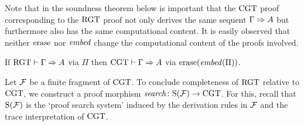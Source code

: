 Note that in the soundness theorem below is important that the $\mathrm{CGT}$ proof
corresponding to the $\mathrm{RGT}$ proof not only derives the same sequent $\Gamma
\Rightarrow A$ but furthermore also has the same computational content. It is easily
observed that neither $\mathrm{erase}$ nor $\mathit{embed}$ change the computational content of
the proofs involved.

\begin{corollary}[Soundness]\label{lem:rct-sound}
  If $\mathrm{RGT} \vdash \Gamma \Rightarrow A$ via $\Pi$ then $\mathrm{CGT} \vdash \Gamma \Rightarrow
  A$ via $\mathrm{erase}(\mathit{embed}(\Pi))$.
\end{corollary}

Let $\mathcal{F}$ be a finite fragment of $\mathrm{CGT}$. To conclude completeness of $\mathrm{RGT}$
relative to $\mathrm{CGT}$, we
construct a proof morphism $\mathit{search} \colon \mathrm{S}(\mathcal{F}) \to \mathrm{CGT}$. For this, recall that
$\mathrm{S}(\mathcal{F})$ is the `proof search system' induced by the derivation rules in $\mathcal{F}$
and the trace interpretation of $\mathrm{CGT}$.

